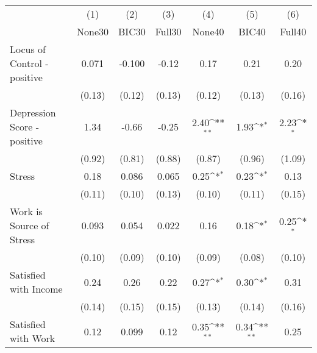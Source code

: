 {
\def\sym#1{\ifmmode^{#1}\else\(^{#1}\)\fi}
\begin{tabular}{l*{6}{c}}
\toprule
            &\multicolumn{1}{c}{(1)}&\multicolumn{1}{c}{(2)}&\multicolumn{1}{c}{(3)}&\multicolumn{1}{c}{(4)}&\multicolumn{1}{c}{(5)}&\multicolumn{1}{c}{(6)}\\
            &\multicolumn{1}{c}{None30}&\multicolumn{1}{c}{BIC30}&\multicolumn{1}{c}{Full30}&\multicolumn{1}{c}{None40}&\multicolumn{1}{c}{BIC40}&\multicolumn{1}{c}{Full40}\\
\midrule
Locus of Control - positive&       0.071         &      -0.100         &       -0.12         &        0.17         &        0.21         &        0.20         \\
            &      (0.13)         &      (0.12)         &      (0.13)         &      (0.12)         &      (0.13)         &      (0.16)         \\
\addlinespace
Depression Score - positive&        1.34         &       -0.66         &       -0.25         &        2.40\sym{**} &        1.93\sym{*}  &        2.23\sym{*}  \\
            &      (0.92)         &      (0.81)         &      (0.88)         &      (0.87)         &      (0.96)         &      (1.09)         \\
\addlinespace
Stress      &        0.18         &       0.086         &       0.065         &        0.25\sym{*}  &        0.23\sym{*}  &        0.13         \\
            &      (0.11)         &      (0.10)         &      (0.13)         &      (0.10)         &      (0.11)         &      (0.15)         \\
\addlinespace
Work is Source of Stress&       0.093         &       0.054         &       0.022         &        0.16         &        0.18\sym{*}  &        0.25\sym{*}  \\
            &      (0.10)         &      (0.09)         &      (0.10)         &      (0.09)         &      (0.08)         &      (0.10)         \\
\addlinespace
Satisfied with Income&        0.24         &        0.26         &        0.22         &        0.27\sym{*}  &        0.30\sym{*}  &        0.31         \\
            &      (0.14)         &      (0.15)         &      (0.15)         &      (0.13)         &      (0.14)         &      (0.16)         \\
\addlinespace
Satisfied with Work&        0.12         &       0.099         &        0.12         &        0.35\sym{**} &        0.34\sym{**} &        0.25         \\

\end{tabular}}
